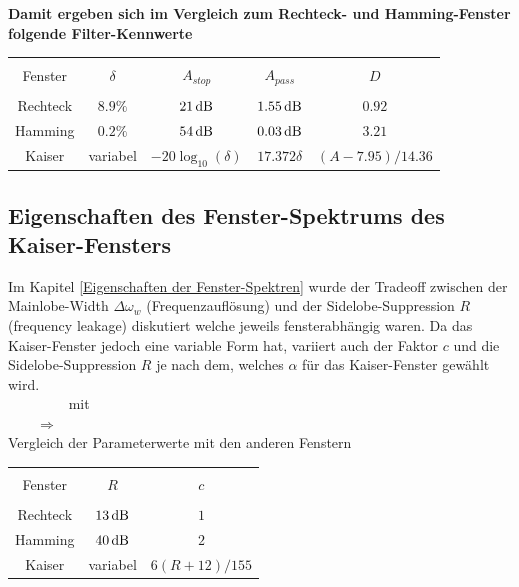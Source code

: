 		\textbf{Damit ergeben sich im Vergleich zum Rechteck- und Hamming-Fenster folgende Filter-Kennwerte}\\[0.2cm]
		\begin{tabular}{|c|c|c|c|c|}
		 \hline&&&&\\[-0.35cm]
			Fenster & $\delta$ & $A_{stop}$ & $A_{pass}$ & $D$ \\[0.05cm]
		 \hline&&&&\\[-0.35cm]
			Rechteck&	$8.9\%$ &	$21\,\text{dB}$ &		$1.55\,\text{dB}$ &	$0.92$\\
			Hamming &	$0.2\%$ &	$54\,\text{dB}$ &		$0.03\,\text{dB}$ &	$3.21$\\
			Kaiser &	variabel&	$-20\log_{10}(\delta)$ & $17.372\delta$ &$(A-7.95)/14.36$\\[0.05cm]
		 \hline
		\end{tabular}

		\subsection{Eigenschaften des Fenster-Spektrums des Kaiser-Fensters}
		Im Kapitel \ref{Eigenschaften der Fenster-Spektren} wurde der Tradeoff zwischen der Mainlobe-Width $\Delta \omega_w$ (Frequenzauflösung) und der Sidelobe-Suppression $R$ (frequency leakage) diskutiert welche jeweils fensterabhängig waren. Da das Kaiser-Fenster jedoch eine variable Form hat, variiert auch der Faktor $c$ und die Sidelobe-Suppression $R$ je nach dem, welches $\alpha$ für das Kaiser-Fenster gewählt wird.\\[0.2cm]
		$\qquad$
		$\qquad$mit $\qquad$\\[0.3cm]
		$\qquad\Rightarrow\quad$\\[0.2cm]
		Vergleich der Parameterwerte mit den anderen Fenstern$\qquad$\begin{tabular}{|c|c|c|}
		 \hline&&\\[-0.35cm]
			Fenster & $R$ & $c$ \\[0.05cm]
		 \hline&&\\[-0.3cm]
			Rechteck&	$13\,\text{dB}$ & $1$ \\
			Hamming &	$40\,\text{dB}$ & $2$\\
			Kaiser &	variabel&	$6(R+12)/155$\\[0.05cm]
		 \hline
		\end{tabular}
